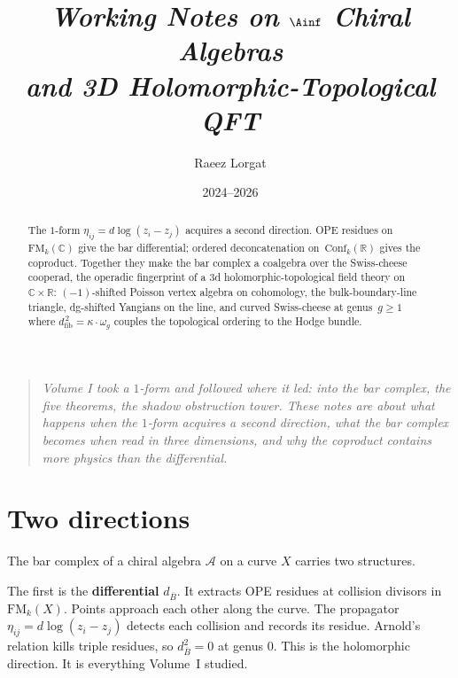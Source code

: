 \documentclass[11pt]{article}
\title{\textit{Working Notes on $\Ainf$ Chiral Algebras\\
and 3D Holomorphic-Topological QFT}}
\author{Raeez Lorgat}
\date{2024--2026}
\newcommand{\cA}{\mathcal{A}}
\newcommand{\barB}{\overline{B}}
\newcommand{\FM}{\mathrm{FM}}
\begin{document}
\maketitle

\begin{abstract}
The $1$-form $\eta_{ij} = d\log(z_i - z_j)$ acquires a second
direction.  OPE residues on~$\mathrm{FM}_k(\mathbb{C})$ give the
bar differential; ordered deconcatenation
on~$\mathrm{Conf}_k(\mathbb{R})$ gives the coproduct.  Together
they make the bar complex a coalgebra over the Swiss-cheese
cooperad, the operadic fingerprint
of a $3$d holomorphic-topological field theory
on~$\mathbb{C} \times \mathbb{R}$:
$(-1)$-shifted Poisson vertex algebra on cohomology,
the bulk-boundary-line triangle, dg-shifted Yangians on the line,
and curved Swiss-cheese at genus~$g \ge 1$ where
$d_{\mathrm{fib}}^{\,2} = \kappa \cdot \omega_g$ couples the
topological ordering to the Hodge bundle.
\end{abstract}

\begin{quote}
\itshape
Volume I took a $1$-form and followed where it led: into the
bar complex, the five theorems, the shadow obstruction tower.
These notes are about what happens when the $1$-form acquires
a second direction, what the bar complex becomes when read in
three dimensions, and why the coproduct contains more physics
than the differential.
\end{quote}

\tableofcontents


\section{Two directions}
\label{sec:two-directions}

The bar complex of a chiral algebra $\cA$ on a curve $X$ carries
two structures.

\medskip

The first is the \textbf{differential} $d_{\barB}$.  It extracts
OPE residues at collision divisors in $\FM_k(X)$.  Points
approach each other along the curve.  The propagator
$\eta_{ij} = d\log(z_i - z_j)$ detects each collision and records
its residue.  Arnold's relation kills triple residues, so
$d_{\barB}^2 = 0$ at genus $0$.  This is the holomorphic
direction.  It is everything Volume~I studied.

\medskip
\end{document}
